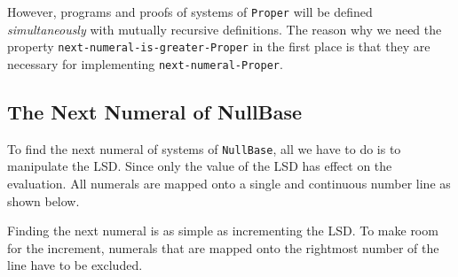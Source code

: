 \documentclass[\main/thesis.tex]{subfiles}
\begin{document}
However, programs and proofs of systems of {\lstinline|Proper|} will be defined
\textit{simultaneously} with mutually recursive definitions.
The reason why we need the property {\lstinline|next-numeral-is-greater-Proper|}
in the first place is that they are necessary for implementing
{\lstinline|next-numeral-Proper|}.

\subsection{The Next Numeral of NullBase}

To find the next numeral of systems of {\lstinline|NullBase|},
all we have to do is to manipulate the LSD.
Since only the value of the LSD has effect on the evaluation.
All numerals are mapped onto a single and continuous number line as shown below.

\begin{center}
    \begin{adjustbox}{max width=\textwidth}
    \end{adjustbox}
\end{center}

Finding the next numeral is as simple as incrementing the LSD.
To make room for the increment, numerals that are mapped onto the rightmost
number of the line have to be excluded.
\end{document}

